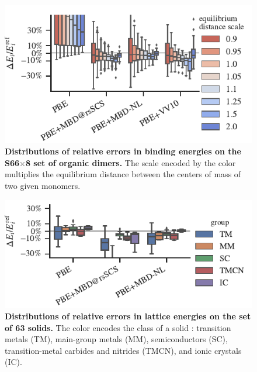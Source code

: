 \begin{figure}[t!]
\centering
\includegraphics{../media/s66-errors.pdf}
\caption{\textbf{Distributions of relative errors in binding energies on the S66$\times$8 set of organic dimers.}
The scale encoded by the color multiplies the equilibrium distance between the centers of mass of two given monomers.
}\label{fig:s66-errors}
\end{figure}

\begin{figure}[t!]
\centering
\includegraphics{../media/solids-errors.pdf}
\caption{\textbf{Distributions of relative errors in lattice energies on the set of 63 solids.}
The color encodes the class of a solid \citep{ZhangNJP18}: transition metals (TM), main-group metals (MM), semiconductors (SC), transition-metal carbides and nitrides (TMCN), and ionic crystals (IC).
}\label{fig:solids-errors}
\end{figure}

